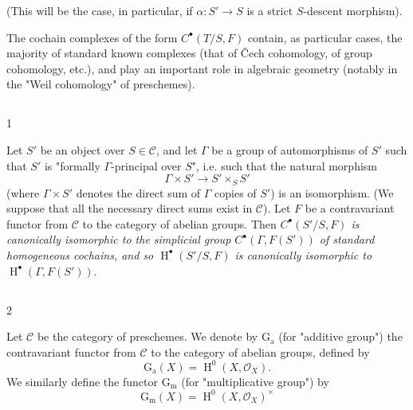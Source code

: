   (This will be the case, in particular, if \(\alpha \colon  S'\to  S\) is a strict \(S\)-descent morphism).\begin{remark}{}\label{fga3.i-a.4.c-remark}\skipsinglepar\par{}The cochain complexes of the form \(C^\bullet (T/S,F)\) contain, as particular cases, the majority of standard known complexes (that of Čech cohomology, of group cohomology, etc.), and play an important role in algebraic geometry (notably in the "Weil cohomology" of preschemes).\end{remark}\subsection{}\label{fga3.i-a.4.d}\begin{example}{1}\label{fga3.i-a.4-example-1}\skipsinglepar\par{}Let \(S'\) be an object over \(S\in \mathcal {C}\), and let \(\Gamma \) be a group of automorphisms of \(S'\) such that \(S'\) is "formally \(\Gamma \)-principal over \(S\)", i.e. such that the natural morphism
    \[       \Gamma \times  S' \to  S'\times _S S'     \]
    (where \(\Gamma \times  S'\) denotes the direct sum of \(\Gamma \) copies of \(S'\)) is an isomorphism.
    (We suppose that all the necessary direct sums exist in \(\mathcal {C}\)).
    Let \(F\) be a contravariant functor from \(\mathcal {C}\) to the category of abelian groups.
    Then \emph{\(C^\bullet (S'/S,F)\) is canonically isomorphic to the simplicial group \(C^\bullet (\Gamma ,F(S'))\) of standard homogeneous cochains, and so \(\operatorname {H}^\bullet (S'/S,F)\) is canonically isomorphic to \(\operatorname {H}^\bullet (\Gamma ,F(S'))\)}.\end{example}\subsection{}\label{fga3.i-a.4.e}\begin{example}{2}\label{fga3.i-a.4-example-2}\skipsinglepar\par{}Let \(\mathcal {C}\) be the category of preschemes.
    We denote by \(\operatorname {G_a}\) (for "additive group") the contravariant functor from \(\mathcal {C}\) to the category of abelian groups, defined by
    \[       \operatorname {G_a}(X)       = \operatorname {H}^0(X,\mathscr {O}_X).     \]
    We similarly define the functor \(\operatorname {G_m}\) (for "multiplicative group") by
    \[       \operatorname {G_m}(X)       = \operatorname {H}^0(X,\mathscr {O}_X)^\times      \]
    

\end{example}
